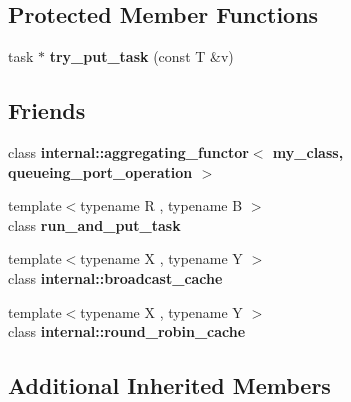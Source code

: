 \subsection*{Protected Member Functions}
\begin{DoxyCompactItemize}
\item 
\hypertarget{classinternal_1_1queueing__port_a8e7282fa0b262d9fd813bc94b00d2bc9}{}task $\ast$ {\bfseries try\+\_\+put\+\_\+task} (const T \&v)\label{classinternal_1_1queueing__port_a8e7282fa0b262d9fd813bc94b00d2bc9}

\end{DoxyCompactItemize}
\subsection*{Friends}
\begin{DoxyCompactItemize}
\item 
\hypertarget{classinternal_1_1queueing__port_a84dd97089b354d1004c34b624bdd6881}{}class {\bfseries internal\+::aggregating\+\_\+functor$<$ my\+\_\+class, queueing\+\_\+port\+\_\+operation $>$}\label{classinternal_1_1queueing__port_a84dd97089b354d1004c34b624bdd6881}

\item 
\hypertarget{classinternal_1_1queueing__port_abaf9bf74ca5f2854d09f5f07337280eb}{}{\footnotesize template$<$typename R , typename B $>$ }\\class {\bfseries run\+\_\+and\+\_\+put\+\_\+task}\label{classinternal_1_1queueing__port_abaf9bf74ca5f2854d09f5f07337280eb}

\item 
\hypertarget{classinternal_1_1queueing__port_a1360e38efe396058978cf3754ad620f5}{}{\footnotesize template$<$typename X , typename Y $>$ }\\class {\bfseries internal\+::broadcast\+\_\+cache}\label{classinternal_1_1queueing__port_a1360e38efe396058978cf3754ad620f5}

\item 
\hypertarget{classinternal_1_1queueing__port_acbd9ac2610587a99cd7d43344297cc49}{}{\footnotesize template$<$typename X , typename Y $>$ }\\class {\bfseries internal\+::round\+\_\+robin\+\_\+cache}\label{classinternal_1_1queueing__port_acbd9ac2610587a99cd7d43344297cc49}

\end{DoxyCompactItemize}
\subsection*{Additional Inherited Members}


